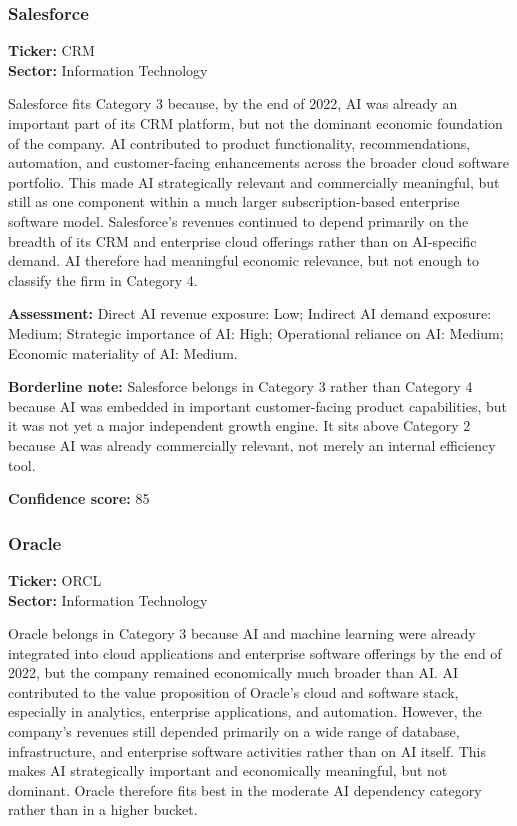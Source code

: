 \documentclass{article}
\begin{document}
\subsubsection*{Salesforce}
\textbf{Ticker:} CRM \\
\textbf{Sector:} Information Technology

Salesforce fits Category 3 because, by the end of 2022, AI was already an important part of its CRM platform, but not the dominant economic foundation of the company. AI contributed to product functionality, recommendations, automation, and customer-facing enhancements across the broader cloud software portfolio. This made AI strategically relevant and commercially meaningful, but still as one component within a much larger subscription-based enterprise software model. Salesforce’s revenues continued to depend primarily on the breadth of its CRM and enterprise cloud offerings rather than on AI-specific demand. AI therefore had meaningful economic relevance, but not enough to classify the firm in Category 4.

\textbf{Assessment:} Direct AI revenue exposure: Low; Indirect AI demand exposure: Medium; Strategic importance of AI: High; Operational reliance on AI: Medium; Economic materiality of AI: Medium.

\textbf{Borderline note:} Salesforce belongs in Category 3 rather than Category 4 because AI was embedded in important customer-facing product capabilities, but it was not yet a major independent growth engine. It sits above Category 2 because AI was already commercially relevant, not merely an internal efficiency tool.

\textbf{Confidence score:} 85

\subsubsection*{Oracle}
\textbf{Ticker:} ORCL \\
\textbf{Sector:} Information Technology

Oracle belongs in Category 3 because AI and machine learning were already integrated into cloud applications and enterprise software offerings by the end of 2022, but the company remained economically much broader than AI. AI contributed to the value proposition of Oracle’s cloud and software stack, especially in analytics, enterprise applications, and automation. However, the company’s revenues still depended primarily on a wide range of database, infrastructure, and enterprise software activities rather than on AI itself. This makes AI strategically important and economically meaningful, but not dominant. Oracle therefore fits best in the moderate AI dependency category rather than in a higher bucket.
\end{document}

